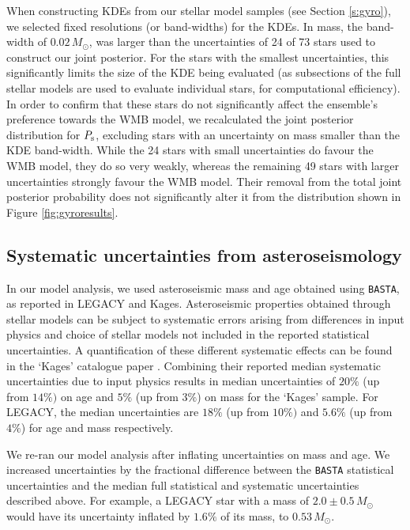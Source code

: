 When constructing KDEs from our stellar model samples (see Section \ref{s:gyro}), we selected fixed resolutions (or band-widths) for the KDEs. In mass, the band-width of $0.02\, M_\odot$, was larger than the uncertainties of 24 of 73 stars used to construct our joint posterior. For the stars with the smallest uncertainties, this significantly limits the size of the KDE being evaluated (as subsections of the full stellar models are used to evaluate individual stars, for computational efficiency). In order to confirm that these stars do not significantly affect the ensemble's preference towards the WMB model, we recalculated the joint posterior distribution for $P_{\rm s}$, excluding stars with an uncertainty on mass smaller than the KDE band-width. While the 24 stars with small uncertainties do favour the WMB model, they do so very weakly, whereas the remaining 49 stars with larger uncertainties strongly favour the WMB model. Their removal from the total joint posterior probability does not significantly alter it from the distribution shown in Figure \ref{fig:gyroresults}.

\subsection{Systematic uncertainties from asteroseismology}
In our model analysis, we used asteroseismic mass and age obtained using \texttt{BASTA}, as reported in LEGACY and Kages. Asteroseismic properties obtained through stellar models can be subject to systematic errors arising from differences in input physics and choice of stellar models not included in the reported statistical uncertainties. A quantification of these different systematic effects can be found in the `Kages' catalogue paper \cite{silvaaguirre+2015}. Combining their reported median systematic uncertainties due to input physics results in median uncertainties of $20\%$ (up from $14\%)$ on age and $5\%$ (up from $3\%$) on mass for the `Kages' sample. For LEGACY, the median uncertainties are $18\%$ (up from $10\%)$ and $5.6\%$ (up from $4\%$) for age and mass respectively.

We re-ran our model analysis after inflating uncertainties on mass and age. We increased uncertainties by the fractional difference between the \texttt{BASTA} statistical uncertainties and the median full statistical and systematic uncertainties described above. For example, a LEGACY star with a mass of $2.0 \pm 0.5\, M_\odot$ would have its uncertainty inflated by $1.6\%$ of its mass, to $0.53\, M_\odot$. 

